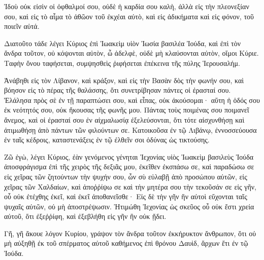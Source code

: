 {Ἰδοὺ οὐκ εἰσὶν οἱ ὀφθαλμοί σου, οὐδὲ ἡ καρδία σου καλὴ, ἀλλὰ εἰς τὴν πλεονεξίαν σου, καὶ εἰς τὸ αἷμα τὸ ἀθῶον τοῦ ἐκχέαι αὐτὸ, καὶ εἰς ἀδικήματα καὶ εἰς φόνον, τοῦ ποιεῖν αὐτά.
\par }{\PP {}Διατοῦτο τάδε λέγει Κύριος ἐπὶ Ἰωακεὶμ υἱὸν Ἰωσία βασιλέα Ἰούδα, καὶ ἐπὶ τὸν ἄνδρα τοῦτον, οὐ κόψονται αὐτὸν, ὦ ἀδελφὲ, οὐδὲ μὴ κλαύσονται αὐτὸν, οἴμοι Κύριε.
Ταφὴν ὄνου ταφήσεται, συμψησθεὶς ῥιφήσεται ἐπέκεινα τῆς πύλης Ἱερουσαλήμ.
\par }{\PP {}Ἀνάβηθι εἰς τὸν Λίβανον, καὶ κράξον, καὶ εἰς τὴν Βασὰν δὸς τὴν φωνήν σου, καὶ βόησον εἰς τὸ πέρας τῆς θαλάσσης, ὅτι συνετρίβησαν πάντες οἱ ἐρασταί σου.
Ἐλάλησα πρὸς σὲ ἐν τῇ παραπτώσει σου, καὶ εἶπας, οὐκ ἀκούσομαι· αὕτη ἡ ὁδός σου ἐκ νεότητός σου, οὐκ ἤκουσας τῆς φωνῆς μου.
Πάντας τοὺς ποιμένας σου ποιμανεῖ ἄνεμος, καὶ οἱ ἐρασταί σου ἐν αἰχμαλωσίᾳ ἐξελεύσονται, ὅτι τότε αἰσχυνθήσῃ καὶ ἀτιμωθήσῃ ἀπὸ πάντων τῶν φιλούντων σε.
Κατοικοῦσα ἐν τῷ Λιβάνῳ, ἐννοσσεύουσα ἐν ταῖς κέδροις, καταστενάξεις ἐν τῷ ἐλθεῖν σοι ὀδύνας ὡς τικτούσης.
\par }{\PP {}Ζῶ ἐγὼ, λέγει Κύριος, ἐὰν γενόμενος γένηται Ἰεχονίας υἱὸς Ἰωακεὶμ βασιλεὺς Ἰούδα ἀποσφράγισμα ἐπὶ τῆς χειρὸς τῆς δεξιᾶς μου, ἐκεῖθεν ἐκσπάσω σε,
καὶ παραδώσω σε εἰς χεῖρας τῶν ζητούντων τὴν ψυχήν σου, ὧν σὺ εὐλαβῇ ἀπὸ προσώπου αὐτῶν, εἰς χεῖρας τῶν Χαλδαίων,
καὶ ἀποῤῥίψω σε καὶ τὴν μητέρα σου τὴν τεκοῦσάν σε εἰς γῆν, οὗ οὐκ ἐτέχθης ἐκεῖ, καὶ ἐκεῖ ἀποθανεῖσθε·
Εἰς δὲ τὴν γῆν ἣν αὐτοὶ εὔχονται ταῖς ψυχαῖς αὐτῶν, οὐ μὴ ἀποστρέψωσιν.
Ἠτιμώθη Ἰεχονίας ὡς σκεῦος οὗ οὐκ ἔστι χρεία αὐτοῦ, ὅτι ἐξεῤῥίφη, καὶ ἐξεβλήθη εἰς γῆν ἣν οὐκ ᾔδει.
\par }{\PP {}Γῆ, γῆ ἄκουε λόγον Κυρίου,
γράψον τὸν ἄνδρα τοῦτον ἐκκήρυκτον ἄνθρωπον, ὅτι οὐ μὴ αὐξηθῇ ἐκ τοῦ σπέρματος αὐτοῦ καθήμενος ἐπὶ θρόνου Δαυὶδ, ἄρχων ἔτι ἐν τῷ Ἰούδα.

}
